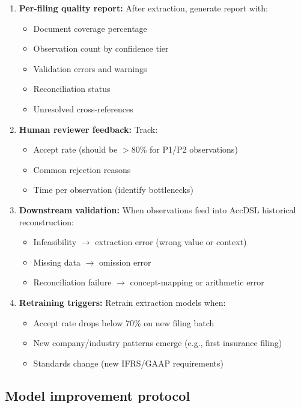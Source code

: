 \begin{enumerate}
\item \textbf{Per-filing quality report:} After extraction, generate report with:
  \begin{itemize}
  \item Document coverage percentage
  \item Observation count by confidence tier
  \item Validation errors and warnings
  \item Reconciliation status
  \item Unresolved cross-references
  \end{itemize}

\item \textbf{Human reviewer feedback:} Track:
  \begin{itemize}
  \item Accept rate (should be $>$80\% for P1/P2 observations)
  \item Common rejection reasons
  \item Time per observation (identify bottlenecks)
  \end{itemize}

\item \textbf{Downstream validation:} When observations feed into AccDSL historical
  reconstruction:
  \begin{itemize}
  \item Infeasibility $\rightarrow$ extraction error (wrong value or context)
  \item Missing data $\rightarrow$ omission error
  \item Reconciliation failure $\rightarrow$ concept-mapping or arithmetic error
  \end{itemize}

\item \textbf{Retraining triggers:} Retrain extraction models when:
  \begin{itemize}
  \item Accept rate drops below 70\% on new filing batch
  \item New company/industry patterns emerge (e.g., first insurance filing)
  \item Standards change (new IFRS/GAAP requirements)
  \end{itemize}
\end{enumerate}

\subsection{Model improvement protocol}

